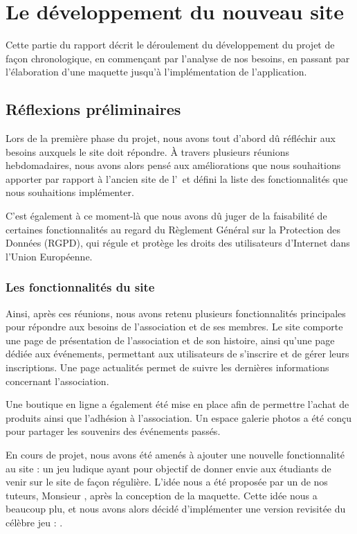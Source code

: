 \chapter{Le développement du nouveau site}

Cette partie du rapport décrit le déroulement du développement du projet de façon chronologique, en commençant par l'analyse de nos besoins, en passant par l'élaboration d'une maquette jusqu'à l'implémentation de l'application.

\section{Réflexions préliminaires}

Lors de la première phase du projet, nous avons tout d'abord dû réfléchir aux besoins auxquels le site doit répondre.  
À travers plusieurs réunions hebdomadaires, nous avons alors pensé aux améliorations que nous souhaitions apporter par rapport à l’ancien site de l’\ofni\ et défini la liste des fonctionnalités que nous souhaitions implémenter.  

C'est également à ce moment-là que nous avons dû juger de la faisabilité de certaines fonctionnalités au regard du Règlement Général sur la Protection des Données (RGPD), qui régule et protège les droits des utilisateurs d'Internet dans l'Union Européenne.

\subsection{Les fonctionnalités du site}

Ainsi, après ces réunions, nous avons retenu plusieurs fonctionnalités principales pour répondre aux besoins de l'association et de ses membres. Le site comporte une page de présentation de l’association et de son histoire, ainsi qu’une page dédiée aux événements, permettant aux utilisateurs de s’inscrire et de gérer leurs inscriptions. Une page actualités permet de suivre les dernières informations concernant l’association.  

Une boutique en ligne a également été mise en place afin de permettre l’achat de produits ainsi que l’adhésion à l’association. Un espace galerie photos a été conçu pour partager les souvenirs des événements passés.  

En cours de projet, nous avons été amenés à ajouter une nouvelle fonctionnalité au site : un jeu ludique ayant pour objectif de donner envie aux étudiants de venir sur le site de façon régulière. L'idée nous a été proposée par un de nos tuteurs, Monsieur , après la conception de la maquette. Cette idée nous a beaucoup plu, et nous avons alors décidé d'implémenter une version revisitée du célèbre jeu : \game.
\pagebreak

